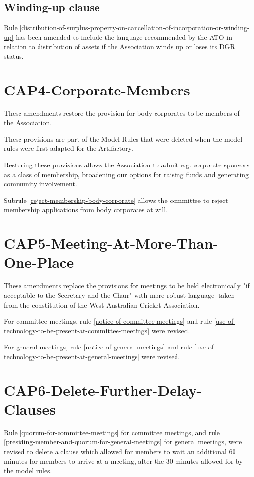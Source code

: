 \documentclass[../constitution.tex]{subfiles}
\begin{document}
\subsection*{Winding-up clause}

Rule \ref{distribution-of-surplus-property-on-cancellation-of-incorporation-or-winding-up} has been amended to include the language recommended by the ATO in relation to distribution of assets if the Association winds up or loses its DGR status.


\section*{CAP4-Corporate-Members}

These amendments restore the provision for body corporates to be members of the Association.

These provisions are part of the Model Rules that were deleted when the model rules were first adapted for the Artifactory.

Restoring these provisions allows the Association to admit e.g. corporate sponsors as a class of membership, broadening our options for raising funds and generating community involvement.

Subrule \ref{reject-membership-body-corporate} allows the committee to reject membership applications from body corporates at will.

\section*{CAP5-Meeting-At-More-Than-One-Place}

These amendments replace the provisions for meetings to be held electronically "if acceptable to the Secretary and the Chair" with more robust language, taken from the constitution of the West Australian Cricket Association.

For committee meetings, rule \ref{notice-of-committee-meetings} and rule \ref{use-of-technology-to-be-present-at-committee-meetings} were revised.

For general meetings, rule \ref{notice-of-general-meetings} and rule \ref{use-of-technology-to-be-present-at-general-meetings} were revised.

\section*{CAP6-Delete-Further-Delay-Clauses}

Rule \ref{quorum-for-committee-meetings} for committee meetings, and rule \ref{presiding-member-and-quorum-for-general-meetings} for general meetings, were revised to delete a clause which allowed for members to wait an additional 60 minutes for members to arrive at a meeting, after the 30 minutes allowed for by the model rules.
\end{document}
